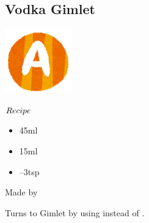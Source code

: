 \subsection{Vodka Gimlet}
\vspace{-7.4mm}
\hspace{40mm}
\includegraphics[scale=.12]{capital_a.png}
\vspace{2.5mm}
\begin{itembox}[l]{\boldmath $Recipe$}
\begin{itemize}
\setlength{\parskip}{0cm}
\setlength{\itemsep}{0cm}
\item \vodka 45ml
\item \limj 15ml
\item {}--3tsp
\end{itemize}
\vspace{-4mm}
Made by \shake
\end{itembox}
Turns to Gimlet by using \gin instead of \vodka
\hspace{-1mm}.
